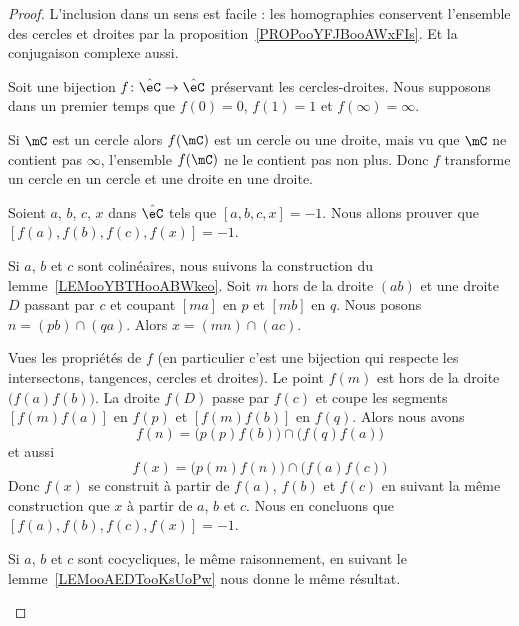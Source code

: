 \begin{proof}
	L'inclusion dans un sens est facile : les homographies conservent l'ensemble des cercles et droites par la proposition~\ref{PROPooYFJBooAWxFIs}. Et la conjugaison complexe aussi.

	Soit une bijection \( f\colon \hat \eC\to \hat\eC\) préservant les cercles-droites. Nous supposons dans un premier temps que \( f(0)=0\), \( f(1)=1\) et \( f(\infty)=\infty\).

	\begin{subproof}
		\spitem[Pour \( f\) vérifiant \( f(0,1,\infty)=0,1,\infty\)]

		Si \( \mC\) est un cercle alors \( f(\mC)\) est un cercle ou une droite, mais vu que \( \mC\) ne contient pas \( \infty\), l'ensemble \( f(\mC)\) ne le contient pas non plus. Donc \( f\) transforme un cercle en un cercle et une droite en une droite.

		\begin{subproof}

			Soient \( a\), \( b\), \( c\), \( x\) dans \( \hat\eC\) tels que \( [a,b,c,x]=-1\). Nous allons prouver que \( [f(a),f(b),f(c),f(x)]=-1\).


			Si \( a\), \( b\) et \( c\) sont colinéaires, nous suivons la construction du lemme~\ref{LEMooYBTHooABWkeo}. Soit \( m\) hors de la droite \( (ab)\) et une droite \( D\) passant par \( c\) et coupant \( [ma]\) en \( p\) et \( [mb]\) en \( q\). Nous posons \( n=(pb)\cap(qa)\). Alors \( x=(mn)\cap(ac)\).

			Vues les propriétés de \( f\) (en particulier c'est une bijection qui respecte les intersectons, tangences, cercles et droites). Le point \( f(m)\) est hors de la droite \( \big( f(a)f(b) \big)\). La droite \( f(D)\) passe par \( f(c)\) et coupe les segments \( [f(m)f(a)]\) en \( f(p)\) et \( [f(m)f(b)]\) en \( f(q)\). Alors nous avons
			\begin{equation}
				f(n)=\big( p(p)f(b) \big)\cap\big( f(q)f(a) \big)
			\end{equation}
			et aussi
			\begin{equation}
				f(x)=\big( p(m)f(n) \big)\cap\big( f(a)f(c) \big)
			\end{equation}
			Donc \( f(x)\) se construit à partir de \( f(a)\), \( f(b)\) et \( f(c)\) en suivant la même construction que \( x\) à partir de \( a\), \( b\) et \( c\). Nous en concluons que \( [f(a), f(b),f(c),f(x)]=-1\).

			Si \( a\), \( b\) et \( c\) sont cocycliques, le même raisonnement, en suivant le lemme~\ref{LEMooAEDTooKsUoPw} nous donne le même résultat.


\end{subproof}
\end{subproof}
\end{proof}
